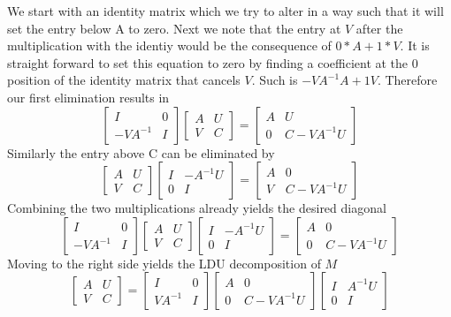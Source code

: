 \documentclass{article}
\begin{document}
We start with an identity matrix which we try to alter in a way such that it will set the entry below A to zero. Next we note that the entry at $V$ after the multiplication with the identiy would be the consequence of $0 * A + 1 * V$. It is straight forward to set this equation to zero by finding a coefficient at the $0$ position of the identity matrix that cancels $V$. Such is $-VA^{-1} A + 1 V$. 
Therefore our first elimination results in
$$\left[ \begin{array}{cc}{I} & {0} \\ {-V A^{-1}} & {I}\end{array}\right] \left[ \begin{array}{cc}{A} & {U} \\ {V} & {C}\end{array}\right]=\left[ \begin{array}{cc}{A} & {U} \\ {0} & {C-V A^{-1} U}\end{array}\right]$$
Similarly the entry above C can be eliminated by
$$\left[ \begin{array}{cc}{A} & {U} \\ {V} & {C}\end{array}\right] \left[ \begin{array}{cc}{I} & {-A^{-1} U} \\ {0} & {I}\end{array}\right]=\left[ \begin{array}{cc}{A} & {0} \\ {V} & {C-V A^{-1} U}\end{array}\right]$$
Combining the two multiplications already yields the desired diagonal
$$\left[ \begin{array}{cc}{I} & {0} \\ {-V A^{-1}} & {I}\end{array}\right] \left[ \begin{array}{cc}{A} & {U} \\ {V} & {C}\end{array}\right] \left[ \begin{array}{cc}{I} & {-A^{-1} U} \\ {0} & {I}\end{array}\right]=\left[ \begin{array}{cc}{A} & {0} \\ {0} & {C-V A^{-1} U}\end{array}\right]$$
Moving to the right side yields the LDU decomposition of $M$
$$\left[ \begin{array}{ll}{A} & {U} \\ {V} & {C}\end{array}\right]=\left[ \begin{array}{cc}{I} & {0} \\ {V A^{-1}} & {I}\end{array}\right] \left[ \begin{array}{cc}{A} & {0} \\ {0} & {C-V A^{-1} U}\end{array}\right] \left[ \begin{array}{cc}{I} & {A^{-1} U} \\ {0} & {I}\end{array}\right]$$
\end{document}
